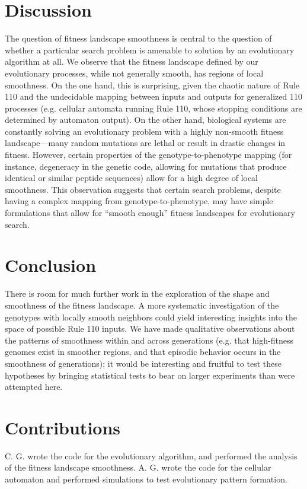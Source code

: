 \documentclass[twocolumn]{article}
\begin{document}
\section{Discussion}


The question of fitness landscape smoothness is central to the question of whether a particular search problem is amenable to solution by an evolutionary algorithm at all. We observe that the fitness landscape defined by our evolutionary processes, while not generally smooth, has regions of local smoothness. On the one hand, this is surprising, given the chaotic nature of Rule 110 and the undecidable mapping between inputs and outputs for generalized 110 processes (e.g. cellular automata running Rule 110, whose stopping conditions are determined by automaton output). On the other hand, biological systems are constantly solving an evolutionary problem with a highly non-smooth fitness landscape---many random mutations are lethal or result in drastic changes in fitness. However, certain properties of the genotype-to-phenotype mapping (for instance, degeneracy in the genetic code, allowing for mutations that produce identical or similar peptide sequences) allow for a high degree of local smoothness. This observation suggests that certain search problems, despite having a complex mapping from genotype-to-phenotype, may have simple formulations that allow for ``smooth enough'' fitness landscapes for evolutionary search. 

\section{Conclusion}

There is room for much further work in the exploration of the shape and smoothness of the fitness landscape. A more systematic investigation of the genotypes with locally smooth neighbors could yield interesting insights into the space of possible Rule 110 inputs. We have made qualitative observations about the patterns of smoothness within and across generations (e.g. that high-fitness genomes exist in smoother regions, and that episodic behavior occurs in the smoothness of generations); it would be interesting and fruitful to test these hypotheses by bringing statistical tests to bear on larger experiments than were attempted here.

\section{Contributions}

C. G. wrote the code for the evolutionary algorithm, and performed the analysis of the fitness landscape smoothness. A. G. wrote the code for the cellular automaton and performed simulations to test evolutionary pattern formation.  
\end{document}

